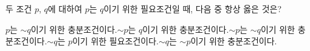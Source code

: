 두 조건 $p$, $q$에 대하여 $p$는 $q$이기 위한 필요조건일 때, 다음 중 항상 옳은 것은?
\begin{choicesv}{$p$는 $\sim q$이기 위한 충분조건이다.}{$\sim p$는 $q$이기 위한 충분조건이다.}{$\sim p$는 $\sim q$이기 위한 충분조건이다.}{$\sim q$는 $p$이기 위한 필요조건이다.}{$\sim q$는 $\sim p$이기 위한 충분조건이다.}\end{choicesv}
